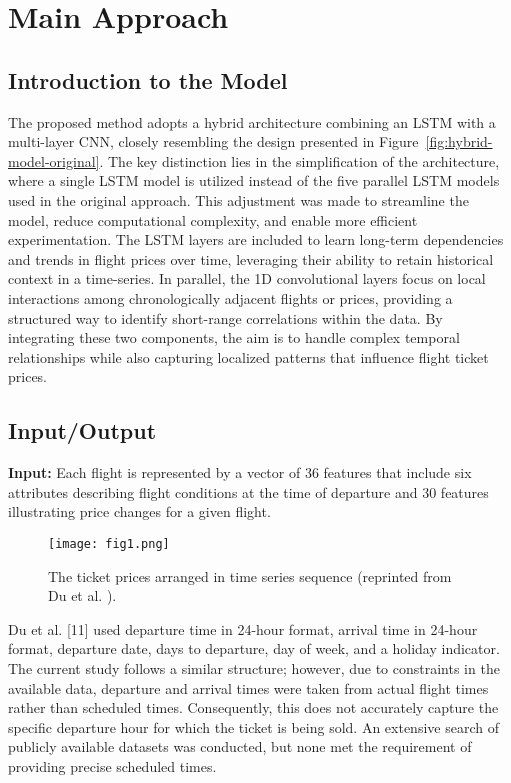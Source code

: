 \documentclass[conference]{IEEEtran}
\begin{document}
\section{Main Approach}
\subsection{Introduction to the Model}\label{5a}
The proposed method adopts a hybrid architecture combining an LSTM with a multi-layer CNN, closely resembling the design presented in Figure~\ref{fig:hybrid-model-original}. The key distinction lies in the simplification of the architecture, where a single LSTM model is utilized instead of the five parallel LSTM models used in the original approach. This adjustment was made to streamline the model, reduce computational complexity, and enable more efficient experimentation. The LSTM layers are included to learn long-term dependencies and trends in flight prices over time, leveraging their ability to retain historical context in a time-series. In parallel, the 1D convolutional layers focus on local interactions among chronologically adjacent flights or prices, providing a structured way to identify short-range correlations within the data. By integrating these two components, the aim is to handle complex temporal relationships while also capturing localized patterns that influence flight ticket prices.

\subsection{Input/Output}\label{5b}
\textbf{Input:} Each flight is represented by a vector of 36 features that include six attributes describing flight conditions at the time of departure and 30 features illustrating price changes for a given flight.

\begin{figure}[htbp]
\centerline{\texttt{[image: fig1.png]}}
\caption{The ticket prices arranged in time series sequence (reprinted from Du et al. \cite{b11}).}
\label{fig:ticket-price-sequence}
\end{figure}

Du et al. [11] used departure time in 24-hour format, arrival time in 24-hour format, departure date, days to departure, day of week, and a holiday indicator. The current study follows a similar structure; however, due to constraints in the available data, departure and arrival times were taken from actual flight times rather than scheduled times. Consequently, this does not accurately capture the specific departure hour for which the ticket is being sold. An extensive search of publicly available datasets was conducted, but none met the requirement of providing precise scheduled times.
\end{document}

